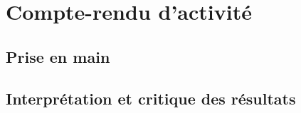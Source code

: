 \chapter{Compte-rendu d'activité}
\paragraph{}

\section{Prise en main}
\section{Interprétation et critique des résultats}
\subparagraph{}
